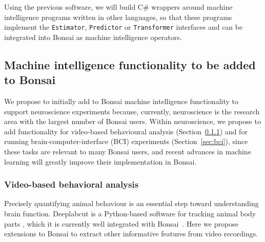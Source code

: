 Using the previous software, we will build C\# wrappers around machine
intelligence programs written in other languages, so that these programs
implement the \texttt{Estimator}, \texttt{Predictor} or \texttt{Transformer}
interfaces and can be integrated into Bonsai as machine intelligence operators.

\subsection{Machine intelligence functionality to be added to Bonsai}
\label{sec:functionality}

We propose to initially add to Bonsai machine intelligence functionality to
support neuroscience experiments because, currently, neuroscience is the
research area with the largest number of Bonsai users. Within neuroscience, we
propose to add functionality for video-based behavioural analysis
(Section~\ref{sec:videoBasedBehavioralAnalysis}) and for running
brain-computer-interface (BCI) experiments (Section~\ref{sec:bci}), since these tasks
are relevant to many Bonsai users, and recent advances in machine learning
will greatly improve their implementation in Bonsai.

\subsubsection{Video-based behavioral analysis}
\label{sec:videoBasedBehavioralAnalysis}

Precisely quantifying animal behaviour is an essential step toward understanding
brain function.  Deeplabcut is a Python-based software for tracking animal body
parts \citep{mathisEtAl18}, which it is currently well integrated with
Bonsai~\citep{kaneEtAl20}. Here we propose extensions to Bonsai to extract
other informative features from video recordings.

